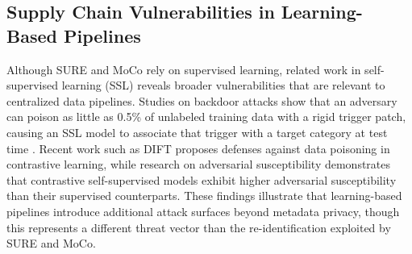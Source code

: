 \subsection{Supply Chain Vulnerabilities in Learning-Based Pipelines}
Although SURE and MoCo rely on supervised learning, related work in self-supervised learning (SSL) reveals broader vulnerabilities that are relevant to centralized data pipelines. Studies on backdoor attacks show that an adversary can poison as little as 0.5\% of unlabeled training data with a rigid trigger patch, causing an SSL model to associate that trigger with a target category at test time \cite{saha2022backdoor, zhu2026dift}. Recent work such as DIFT \cite{zhu2026dift} proposes defenses against data poisoning in contrastive learning, while research on adversarial susceptibility \cite{gupta2022contrastiveselfsupervisedlearningleads} demonstrates that contrastive self-supervised models exhibit higher adversarial susceptibility than their supervised counterparts. These findings illustrate that learning-based pipelines introduce additional attack surfaces beyond metadata privacy, though this represents a different threat vector than the re-identification exploited by SURE and MoCo.


